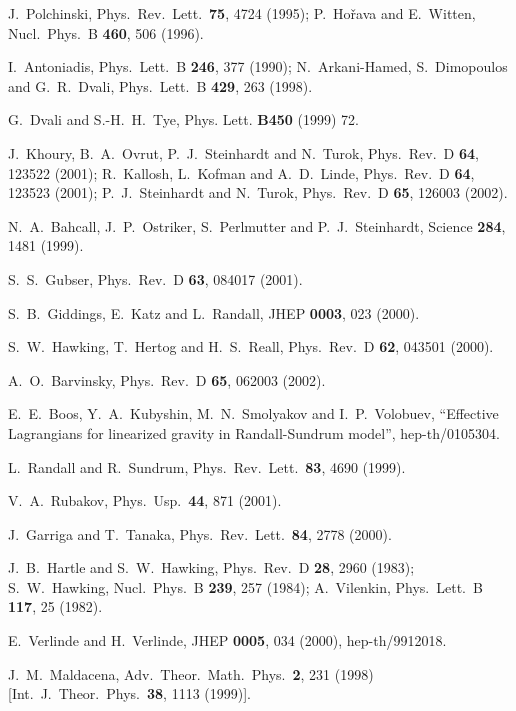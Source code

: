 \documentclass[a4paper,12pt]{article}
\begin{document}
\begin{thebibliography}{9}J.~Polchinski,
Phys.\ Rev.\ Lett.\  {\bf 75}, 4724 (1995);
P.~Ho\v{r}ava and E.~Witten,
Nucl.\ Phys.\ B {\bf 460}, 506 (1996).

 I.~Antoniadis,
Phys.\ Lett.\ B {\bf 246}, 377 (1990);
N.~Arkani-Hamed, S.~Dimopoulos and G.~R.~Dvali,
Phys.\ Lett.\ B {\bf 429}, 263 (1998).

 G.~Dvali and S.-H.~H.~Tye, Phys. Lett. {\bf B450}
(1999) 72.

J.~Khoury, B.~A.~Ovrut, P.~J.~Steinhardt and N.~Turok,
Phys.\ Rev.\ D {\bf 64}, 123522 (2001);
R.~Kallosh, L.~Kofman and A.~D.~Linde,
Phys.\ Rev.\ D {\bf 64}, 123523 (2001);
P.~J.~Steinhardt and N.~Turok,
Phys.\ Rev.\ D {\bf 65}, 126003 (2002).

N.~A.~Bahcall, J.~P.~Ostriker, S.~Perlmutter and P.~J.~Steinhardt,
Science {\bf 284}, 1481 (1999).

 S.~S.~Gubser,
Phys.\ Rev.\ D {\bf 63}, 084017 (2001).

 S.~B.~Giddings, E.~Katz and L.~Randall,
JHEP {\bf 0003}, 023 (2000).

 S.~W.~Hawking, T.~Hertog and H.~S.~Reall,
Phys.\ Rev.\ D {\bf 62}, 043501 (2000).

 A.~O.~Barvinsky,
Phys.\ Rev.\ D {\bf 65}, 062003 (2002).

 E.~E.~Boos, Y.~A.~Kubyshin, M.~N.~Smolyakov
and I.~P.~Volobuev, ``Effective Lagrangians for linearized
gravity in Randall-Sundrum model'', hep-th/0105304.

 L.~Randall and R.~Sundrum,
Phys.\ Rev.\ Lett.\  {\bf 83}, 4690 (1999).

 V.~A.~Rubakov,
Phys.\ Usp.\  {\bf 44}, 871 (2001).

 J.~Garriga and T.~Tanaka,
Phys.\ Rev.\ Lett.\  {\bf 84}, 2778 (2000).

 J.~B.~Hartle and S.~W.~Hawking,
Phys.\ Rev.\ D {\bf 28}, 2960 (1983);
S.~W.~Hawking,
Nucl.\ Phys.\ B {\bf 239}, 257 (1984);
A.~Vilenkin,
Phys.\ Lett.\ B {\bf 117}, 25 (1982).

 E.~Verlinde and H.~Verlinde,
JHEP {\bf 0005}, 034 (2000), hep-th/9912018.

J.~M.~Maldacena,
Adv.\ Theor.\ Math.\ Phys.\  {\bf 2}, 231 (1998)
[Int.\ J.\ Theor.\ Phys.\  {\bf 38}, 1113 (1999)].


\end{thebibliography}
\end{document}
